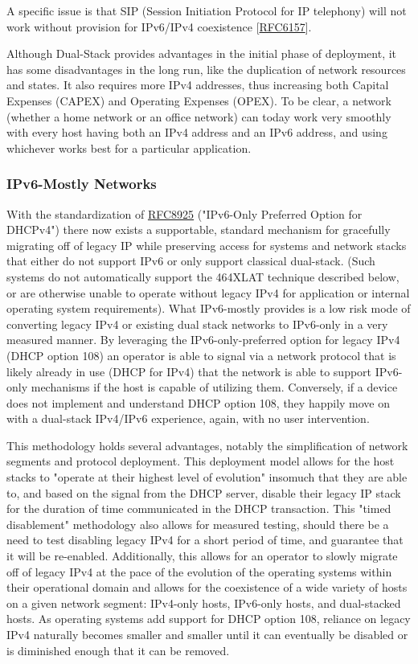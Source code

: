 \documentclass[
]{article}
\begin{document}
A specific issue is that SIP (Session Initiation Protocol for IP
telephony) will not work without provision for IPv6/IPv4 coexistence
{[}\href{https://www.rfc-editor.org/info/rfc6157}{RFC6157}{]}.

Although Dual-Stack provides advantages in the initial phase of
deployment, it has some disadvantages in the long run, like the
duplication of network resources and states. It also requires more IPv4
addresses, thus increasing both Capital Expenses (CAPEX) and Operating
Expenses (OPEX). To be clear, a network (whether a home network or an
office network) can today work very smoothly with every host having both
an IPv4 address and an IPv6 address, and using whichever works best for
a particular application.

\subsubsection{IPv6-Mostly Networks}\label{ipv6-mostly-networks}

With the standardization of
\href{https://www.rfc-editor.org/info/rfc8925}{RFC8925} ("IPv6-Only
Preferred Option for DHCPv4") there now exists a supportable, standard
mechanism for gracefully migrating off of legacy IP while preserving
access for systems and network stacks that either do not support IPv6 or
only support classical dual-stack. (Such systems do not automatically
support the 464XLAT technique described below, or are otherwise unable
to operate without legacy IPv4 for application or internal operating
system requirements). What IPv6-mostly provides is a low risk mode of
converting legacy IPv4 or existing dual stack networks to IPv6-only in a
very measured manner. By leveraging the IPv6-only-preferred option for
legacy IPv4 (DHCP option 108) an operator is able to signal via a
network protocol that is likely already in use (DHCP for IPv4) that the
network is able to support IPv6-only mechanisms if the host is capable
of utilizing them. Conversely, if a device does not implement and
understand DHCP option 108, they happily move on with a dual-stack
IPv4/IPv6 experience, again, with no user intervention.

This methodology holds several advantages, notably the simplification of
network segments and protocol deployment. This deployment model allows
for the host stacks to "operate at their highest level of evolution"
insomuch that they are able to, and based on the signal from the DHCP
server, disable their legacy IP stack for the duration of time
communicated in the DHCP transaction. This "timed disablement"
methodology also allows for measured testing, should there be a need to
test disabling legacy IPv4 for a short period of time, and guarantee
that it will be re-enabled. Additionally, this allows for an operator to
slowly migrate off of legacy IPv4 at the pace of the evolution of the
operating systems within their operational domain and allows for the
coexistence of a wide variety of hosts on a given network segment:
IPv4-only hosts, IPv6-only hosts, and dual-stacked hosts. As operating
systems add support for DHCP option 108, reliance on legacy IPv4
naturally becomes smaller and smaller until it can eventually be
disabled or is diminished enough that it can be removed.
\end{document}
